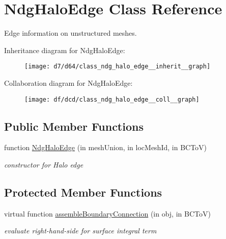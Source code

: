 \hypertarget{class_ndg_halo_edge}{}\section{Ndg\+Halo\+Edge Class Reference}
\label{class_ndg_halo_edge}


Edge information on unstructured meshes.  




Inheritance diagram for Ndg\+Halo\+Edge\+:
\nopagebreak
\begin{figure}[H]
\begin{center}
\leavevmode
\texttt{[image: d7/d64/class\_ndg\_halo\_edge\_\_inherit\_\_graph]}
\end{center}
\end{figure}


Collaboration diagram for Ndg\+Halo\+Edge\+:
\nopagebreak
\begin{figure}[H]
\begin{center}
\leavevmode
\texttt{[image: df/dcd/class\_ndg\_halo\_edge\_\_coll\_\_graph]}
\end{center}
\end{figure}
\subsection*{Public Member Functions}
\begin{DoxyCompactItemize}
\item 
function \hyperlink{class_ndg_halo_edge_a232ca4a341c97be6f36b755a29f17a96}{Ndg\+Halo\+Edge} (in mesh\+Union, in loc\+Mesh\+Id, in B\+C\+ToV)
\begin{DoxyCompactList}\small\item\em constructor for Halo edge \end{DoxyCompactList}\end{DoxyCompactItemize}
\subsection*{Protected Member Functions}
\begin{DoxyCompactItemize}
\item 
virtual function \hyperlink{class_ndg_halo_edge_a516660c74801d977e301ac9688f49d04}{assemble\+Boundary\+Connection} (in obj, in B\+C\+ToV)
\begin{DoxyCompactList}\small\item\em evaluate right-\/hand-\/side for surface integral term \end{DoxyCompactList}\end{DoxyCompactItemize}
